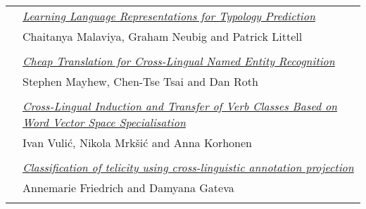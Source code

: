 \begin{tabular}{p{20mm}p{128mm}}
 & \hyperlink{page.2512}{\em Learning Language Representations for Typology Prediction}\\
         & Chaitanya Malaviya, Graham Neubig and Patrick Littell \\
\\

 & \hyperlink{page.2519}{\em Cheap Translation for Cross-Lingual Named Entity Recognition}\\
         & Stephen Mayhew, Chen-Tse Tsai and Dan Roth \\
\\

 & \hyperlink{page.2529}{\em Cross-Lingual Induction and Transfer of Verb Classes Based on Word Vector Space Specialisation}\\
         & Ivan Vuli\'{c}, Nikola Mrk\v{s}i\'{c} and Anna Korhonen \\
\\

 & \hyperlink{page.2542}{\em Classification of telicity using cross-linguistic annotation projection}\\
         & Annemarie Friedrich and Damyana Gateva \\
\\

\end{tabular}
\newpage
